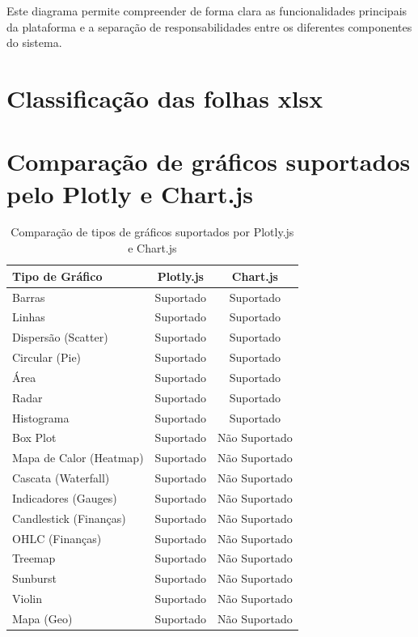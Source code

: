 Este diagrama permite compreender de forma clara as funcionalidades principais da plataforma e a separação de responsabilidades entre os diferentes componentes do sistema.

\chapter{Classificação das folhas \gls{xlsx}}


\chapter{Comparação de gráficos suportados pelo Plotly e Chart.js}
\label{ch:charts}

\begin{table}[H]
\centering
\caption{Comparação de tipos de gráficos suportados por Plotly.js e Chart.js}
\begin{tabular}{|l|c|c|}
\hline
\textbf{Tipo de Gráfico} & \textbf{Plotly.js} & \textbf{Chart.js} \\
\hline
Barras                         & Suportado & Suportado \\
Linhas                         & Suportado & Suportado \\
Dispersão (Scatter)            & Suportado & Suportado \\
Circular (Pie)                 & Suportado & Suportado \\
Área                           & Suportado & Suportado \\
Radar                          & Suportado & Suportado \\
Histograma                     & Suportado & Suportado \\
Box Plot                       & Suportado & Não Suportado \\
Mapa de Calor (Heatmap)        & Suportado & Não Suportado \\
Cascata (Waterfall)            & Suportado & Não Suportado \\
Indicadores (Gauges)           & Suportado & Não Suportado \\
Candlestick (Finanças)         & Suportado & Não Suportado \\
OHLC (Finanças)                & Suportado & Não Suportado \\
Treemap                        & Suportado & Não Suportado \\
Sunburst                       & Suportado & Não Suportado \\
Violin                         & Suportado & Não Suportado \\
Mapa (Geo)                     & Suportado & Não Suportado \\
\hline
\end{tabular}
\label{tab:charts}
\end{table}


